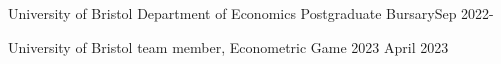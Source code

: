 \documentclass[a4paper,12pt]{article}
\begin{document}


\vspace*{10pt}
{University of Bristol Department of Economics Postgraduate Bursary\hfill Sep 2022-}

{University of Bristol team member, Econometric Game 2023 \hfill April 2023}




\end{document}
